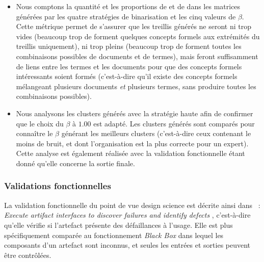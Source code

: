 \begin{itemize}
\item Nous comptons la quantité et les proportions de  \fg et de  \fg dans les matrices générées par les quatre stratégies de binarisation et les cinq valeurs de $ \beta $.
Cette métrique permet de s'assurer que les treillis générés ne seront ni trop vides (beaucoup trop de  \fg forment quelques concepts formels aux extrémités du treillis uniquement), ni trop pleins (beaucoup trop de  \fg forment toutes les combinaisons possibles de documents et de termes), mais feront suffisamment de liens entre les termes et les documents pour que des concepts formels intéressants soient formés (c'est-à-dire qu'il existe des concepts formels mélangeant plusieurs documents \textit{et} plusieurs termes, sans produire toutes les combinaisons possibles).\\

\item Nous analysons les clusters générés avec la stratégie haute afin de confirmer que le choix du $ \beta $ à $ 1.00 $ est adapté.
Les clusters générés sont comparés pour connaître le $ \beta $ générant les meilleurs clusters (c'est-à-dire ceux contenant le moins de bruit, et dont l'organisation est la plus correcte pour un expert).
Cette analyse est également réalisée avec la validation fonctionnelle étant donné qu'elle concerne la sortie finale.
\end{itemize}


\subsubsection{Validations fonctionnelles}
\label{subsubsection:Evaluation:ProtocoleEvaluation:ValidationsStructurellesFonctionnellesREX:Fonctionnelle}

La validation fonctionnelle du point de vue design science est décrite ainsi dans~\cite{hevner2004design} : \og \textit{Execute artifact interfaces to discover failures and identify defects} \fg , c'est-à-dire qu'elle vérifie si l'artefact présente des défaillances à l'usage.
Elle est plus spécifiquement comparée au fonctionnement \og \textit{Black Box} \fg dans lequel les composants d'un artefact sont inconnus, et seules les entrées et sorties peuvent être contrôlées.

\bigskip

